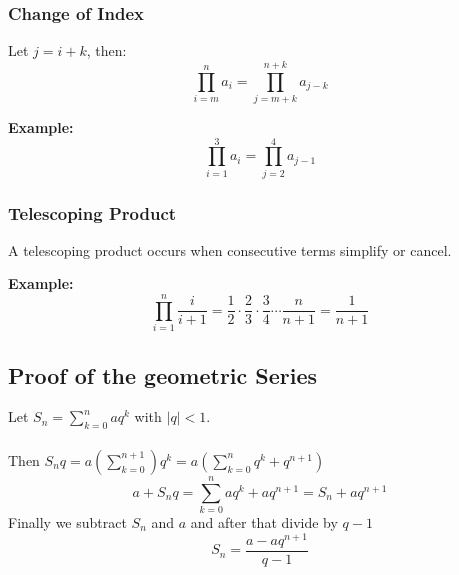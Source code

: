 \subsubsection{Change of Index}

Let \(j = i + k\), then:
\[
\prod_{i = m}^{n} a_i = \prod_{j = m + k}^{n + k} a_{j - k}
\]

\textbf{Example:}
\[
\prod_{i = 1}^{3} a_i = \prod_{j = 2}^{4} a_{j - 1}
\]

\subsubsection{Telescoping Product}

A telescoping product occurs when consecutive terms simplify or cancel.

\textbf{Example:}
\[
\prod_{i = 1}^{n} \frac{i}{i+1} = \frac{1}{2} \cdot \frac{2}{3} \cdot \frac{3}{4} \cdots \frac{n}{n+1} = \frac{1}{n+1}
\]


\subsection{Proof of the geometric Series}

Let \(S_n = \sum_{k = 0}^{n}aq^k\) with \(|q| < 1\).
\\\\
Then \(S_n q = a(\sum_{k = 0}^{n + 1})q^k = a\left( \sum_{k= 0}^{n} q^k + q^{n + 1}\right)\)
\[
a + S_nq = \sum_{k = 0}^{n}aq^k + aq^{n + 1}  = S_n + aq^{n + 1}
\]
Finally we subtract \(S_n\) and \(a\) and after that divide by \(q - 1\)
\[
S_n = \frac{a - aq^{n + 1}}{q - 1}
\]
\QED
\newpage